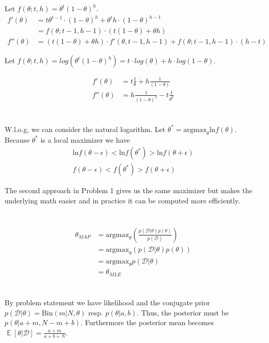 \documentclass[11pt]{article}
\newcommand{\exercise}{\section{}}
\DeclareMathOperator{\E}{\mathbb{E}}
\begin{document}
\exercise

Let $ f(\theta; t, h) = \theta^t (1 - \theta)^h $.
\begin{align*}
f'(\theta) &= t \theta^{t-1} \cdot (1 - \theta)^{h} + \theta^t h \cdot (1 - \theta)^{h - 1} \\
&= f(\theta; t-1, h-1) \cdot (t (1 - \theta) + \theta h) \\
f''(\theta) &= (t (1 - \theta) + \theta h) \cdot f'(\theta, t-1, h-1) + f(\theta; t-1, h-1) \cdot (h - t)
\end{align*}

\noindent Let $ f(\theta; t, h) = log(\theta^t (1 - \theta)^h) = t \cdot log(\theta) + h \cdot log(1 - \theta)$.

\begin{align*}
f'(\theta) &= t \frac{1}{\theta} + h \frac{1}{(1 - \theta)} \\
f''(\theta) &= h \frac{1}{(1 - \theta)^2} - t \frac{1}{\theta^2}
\end{align*}

\exercise

W.l.o.g, we can consider the natural logarithm. Let $\theta^*  = \mathrm{argmax}_\theta  \mathrm{ln}f(\theta)$. Because $\theta^*$ is a local maximizer we have
\begin{align*}
\mathrm{ln}f(\theta - \epsilon) < \mathrm{ln}f(\theta^*) > \mathrm{ln}f(\theta + \epsilon) \\
f(\theta - \epsilon) < f(\theta^*) > f(\theta + \epsilon) \tag{by exponentiation}
\end{align*}

\noindent The second approach in Problem 1 gives us the same maximizer but makes the underlying math easier and in practice it can be computed more efficiently.

\exercise

\begin{align*}
\theta_{MAP} &= \mathrm{argmax}_\theta (\frac{p(\mathcal{D} | \theta ) p(\mathcal{\theta}) }{p(\mathcal{D})} ) \\
&= \mathrm{argmax}_\theta (p(\mathcal{D} | \theta ) p(\mathcal{\theta}) ) \tag{evidence is constant wrt to $\theta$} \\
&= \mathrm{argmax}_\theta p(\mathcal{D} | \theta) \tag{uniform prior is constant}\\
&= \theta_{MLE}
\end{align*}

\exercise

By problem statement we have likelihood and the conjugate prior $p(\mathcal{D} | \theta) =  \mathrm{Bin}(m | N, \theta)$ resp. $p(\theta | a, b)$. Thus, the posterior must be $p(\theta | a+m, N - m + b)$. Furthermore the posterior mean becomes $\E[\theta | \mathcal{D}] = \frac{a + m}{a + b + N}$.
\end{document}
